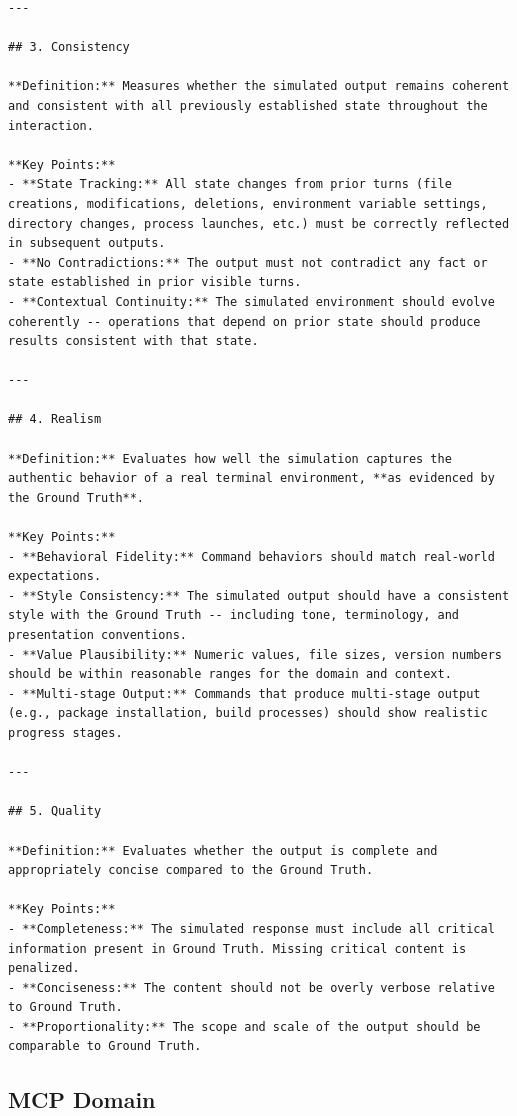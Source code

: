 \documentclass{llmxive}
\begin{document}
\begin{lstlisting}
---

## 3. Consistency

**Definition:** Measures whether the simulated output remains coherent and consistent with all previously established state throughout the interaction.

**Key Points:**
- **State Tracking:** All state changes from prior turns (file creations, modifications, deletions, environment variable settings, directory changes, process launches, etc.) must be correctly reflected in subsequent outputs.
- **No Contradictions:** The output must not contradict any fact or state established in prior visible turns.
- **Contextual Continuity:** The simulated environment should evolve coherently -- operations that depend on prior state should produce results consistent with that state.

---

## 4. Realism

**Definition:** Evaluates how well the simulation captures the authentic behavior of a real terminal environment, **as evidenced by the Ground Truth**.

**Key Points:**
- **Behavioral Fidelity:** Command behaviors should match real-world expectations.
- **Style Consistency:** The simulated output should have a consistent style with the Ground Truth -- including tone, terminology, and presentation conventions.
- **Value Plausibility:** Numeric values, file sizes, version numbers should be within reasonable ranges for the domain and context.
- **Multi-stage Output:** Commands that produce multi-stage output (e.g., package installation, build processes) should show realistic progress stages.

---

## 5. Quality

**Definition:** Evaluates whether the output is complete and appropriately concise compared to the Ground Truth.

**Key Points:**
- **Completeness:** The simulated response must include all critical information present in Ground Truth. Missing critical content is penalized.
- **Conciseness:** The content should not be overly verbose relative to Ground Truth.
- **Proportionality:** The scope and scale of the output should be comparable to Ground Truth.
\end{lstlisting}

\subsection{MCP Domain}
\label{sec:appendix:judge_mcp}
\end{document}
